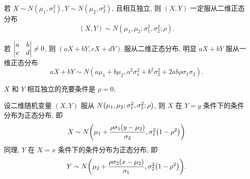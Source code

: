 \begin{theorem}[独立一维正态分布推出二维正态分布]
    若 $ X \sim N\left(\mu_{1}, \sigma_{1}^{2}\right), Y \sim N\left(\mu_{2}, \sigma_{2}^{2}\right)$, 且相互独立, 则 $ (X, Y) $ 一定服从二维正态分布
    $$ (X, Y) \sim N\left(\mu_{1}, \mu_{2}; \sigma_{1}^{2}, \sigma_{2}^{2}; \rho\right) .$$
\end{theorem}

\begin{theorem}
    若 $\mqty|a&b\\c&d|\neq0$, 则 $ (a X+b Y, c X+d Y) $ 服从二维正态分布, 明显 $ a X+b Y $ 服从一维正态分布
    $$a X+b Y \sim N\left(a \mu_{1}+b \mu_{2}, a^{2} \sigma_{1}^{2}+b^{2} \sigma_{2}^{2}+2 a b \rho \sigma_{1} \sigma_{2}\right) .$$
\end{theorem}

\begin{theorem}
    $X $ 和 $ Y $ 相互独立的充要条件是 $ \rho=0 .$
\end{theorem}

\begin{theorem}[二维正态分布的条件分布]
    设二维随机变量 $(X,Y)$ 服从 $N\qty(\mu_1,\mu_2;\sigma^2_1,\sigma^2_2;\rho)$, 则 $X$ 在 $Y=y$ 条件下的条件分布为正态分布, 即
    $$X\sim N\qty(\mu_1+\dfrac{\rho\sigma_1(y-\mu_2)}{\sigma_2},\sigma_1^2\qty(1-\rho^2))$$
    同理, $Y$ 在 $X=x$ 条件下的条件分布为正态分布, 即
    $$Y\sim N\qty(\mu_2+\dfrac{\rho\sigma_2(x-\mu_2)}{\sigma_1},\sigma_2^2\qty(1-\rho^2)).$$
\end{theorem}

